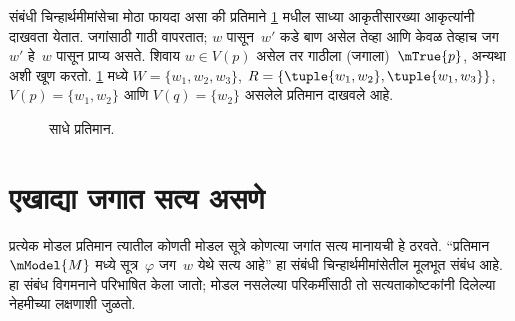 संबंधी चिन्हार्थमीमांसेचा मोठा फायदा असा की प्रतिमाने
\ref{nml:syn:rel:fig:simple} मधील साध्या आकृतीसारख्या आकृत्यांनी दाखवता
येतात. जगांसाठी गाठी वापरतात; $w$ पासून~$w'$ कडे बाण
असेल तेव्हा आणि केवळ तेव्हाच जग~$w'$ हे~$w$ पासून प्राप्य
असते. शिवाय $w \in V(p)$ असेल तर गाठीला (जगाला)~$\mTrue{p}$,
अन्यथा~ अशी खूण करतो. \ref{nml:syn:rel:fig:simple} मध्ये
$W = \{w_1, w_2, w_3\}$, $R = \{\tuple{w_1, w_2},\tuple{w_1,
  w_3}\}$, $V(p) = \{w_1, w_2\}$ आणि $V(q) = \{w_2\}$
असलेले प्रतिमान दाखवले आहे.

\begin{figure}
  \begin{center}
  \end{center}
  \caption{साधे प्रतिमान.}
  \label{nml:syn:rel:fig:simple}
\end{figure}












\section{एखाद्या जगात सत्य असणे}\label{nml:syn:trw:sec}

प्रत्येक मोडल प्रतिमान त्यातील कोणती मोडल सूत्रे कोणत्या
जगांत सत्य मानायची हे ठरवते. ``प्रतिमान~$\mModel{M}$ मध्ये
सूत्र~$\varphi$ जग~$w$ येथे सत्य आहे'' हा संबंधी
चिन्हार्थमीमांसेतील मूलभूत संबंध आहे. हा संबंध विगमनाने
परिभाषित केला जातो; मोडल नसलेल्या परिकर्मींसाठी तो
सत्यताकोष्टकांनी दिलेल्या नेहमीच्या लक्षणाशी जुळतो.

